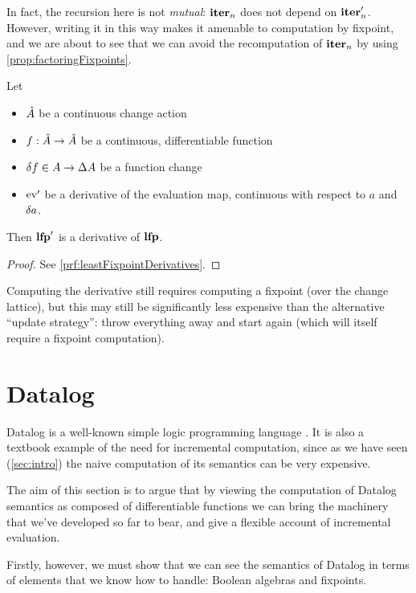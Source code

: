 In fact, the recursion here is not \emph{mutual}: $\textbf{iter}_n$ does
not depend on $\textbf{iter}_n'$. However, writing it in this way makes it
amenable to computation by fixpoint, and we are about to see that we can avoid
the recomputation of $\textbf{iter}_n$ by using \cref{prop:factoringFixpoints}.

\begin{thm}[name=Derivatives of least fixpoint operators, restate=leastFixpointDerivatives]
  \label{thm:leastFixpointDerivatives}
  Let
  \begin{itemize}
    \item $\hat{A}$ be a continuous change action
    \item $f : \hat{A} \rightarrow \hat{A}$ be a continuous, differentiable function
    \item $\delta f \in A \rightarrow \Delta A$ be a function change
    \item $\operatorname{ev}'$ be a derivative of the evaluation map, continuous with
      respect to $a$ and $\delta a$.
  \end{itemize}
  Then $\textbf{lfp}'$ is a derivative of $\textbf{lfp}$.
\end{thm}
\ifproofs
\begin{proof}
  See \cref{prf:leastFixpointDerivatives}.
\end{proof}
\fi

Computing the derivative still requires computing a fixpoint (over the change
lattice), but this may still be significantly less expensive than the
alternative ``update strategy'': throw everything away and start
again (which will itself require a fixpoint computation).

\section{Datalog}
\label{sec:datalog}

Datalog is a well-known simple logic programming language \autocite[See][part D]{abiteboul1995foundations}.
It is also a textbook example of the need for incremental computation, since as we have seen
(\cref{sec:intro}) the naive computation of its semantics can be very expensive.

The aim of this section is to argue that by viewing the computation
of Datalog semantics as composed of differentiable functions we can
bring the machinery that we've developed so far to bear, and give a flexible
account of incremental evaluation. 

Firstly, however, we must show that we can see the semantics of Datalog in terms
of elements that we know how to handle: Boolean algebras and fixpoints.


